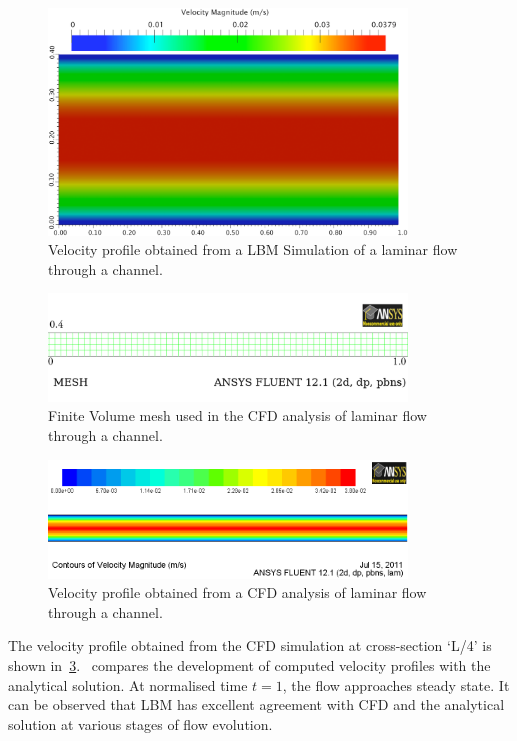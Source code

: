 \begin{figure}[htbp]
	\centering
	\includegraphics[width=0.85\textwidth]{LBM_Poiseuille}
	\caption{Velocity profile obtained from a LBM Simulation of a laminar flow 
	through a 
		channel.}
	\label{fig:LBMcontour}
\end{figure}
%
\begin{figure}[htbp]
	\centering
	\includegraphics[width=0.85\textwidth]{CFD_Mesh}
	\caption{Finite Volume mesh used in the CFD analysis of laminar flow 
	through a 
		channel.}
	\label{fig:CFDmesh}
\end{figure}
%
\begin{figure}[htbp]
	\centering
	\includegraphics[width=0.85\textwidth]{CFD_Poiseuille}
	\caption{Velocity profile obtained from a CFD analysis of laminar flow 
	through a 
	channel.}
	\label{fig:CFDcontour}
\end{figure}

The velocity profile obtained from the CFD simulation at cross-section `L/4' is 
shown in~\cref{fig:CFDcontour}.~ compares the development of 
computed velocity profiles with the analytical solution. At normalised time $t 
= 1$, the flow approaches steady state. It can be observed that LBM has 
excellent agreement with CFD and the analytical solution at various stages of 
flow evolution.

